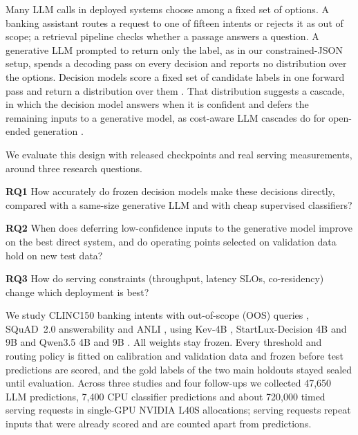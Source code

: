 \documentclass[11pt]{article}
\begin{document}
Many LLM calls in deployed systems choose among a fixed set of options. A banking assistant routes a request to one of fifteen intents or rejects it as out of scope; a retrieval pipeline checks whether a passage answers a question. A generative LLM prompted to return only the label, as in our constrained-JSON setup, spends a decoding pass on every decision and reports no distribution over the options. Decision models score a fixed set of candidate labels in one forward pass and return a distribution over them \citep{li2026jevcascade,zhuang2026startlux}. That distribution suggests a cascade, in which the decision model answers when it is confident and defers the remaining inputs to a generative model, as cost-aware LLM cascades do for open-ended generation \citep{chen2023frugalgpt,gupta2024cascades}.

We evaluate this design with released checkpoints and real serving measurements, around three research questions.

\textbf{RQ1} How accurately do frozen decision models make these decisions directly, compared with a same-size generative LLM and with cheap supervised classifiers?

\textbf{RQ2} When does deferring low-confidence inputs to the generative model improve on the best direct system, and do operating points selected on validation data hold on new test data?

\textbf{RQ3} How do serving constraints (throughput, latency SLOs, co-residency) change which deployment is best?

We study CLINC150 banking intents with out-of-scope (OOS) queries \citep{larson-etal-2019-evaluation}, SQuAD~2.0 answerability \citep{rajpurkar-etal-2018-know} and ANLI \citep{nie-etal-2020-adversarial}, using Kev-4B \citep{kev4b}, StartLux-Decision 4B and 9B \citep{zhuang2026startlux} and Qwen3.5 4B and 9B \citep{qwen35}. All weights stay frozen. Every threshold and routing policy is fitted on calibration and validation data and frozen before test predictions are scored, and the gold labels of the two main holdouts stayed sealed until evaluation. Across three studies and four follow-ups we collected 47,650 LLM predictions, 7,400 CPU classifier predictions and about 720,000 timed serving requests in single-GPU NVIDIA L40S allocations; serving requests repeat inputs that were already scored and are counted apart from predictions.
\end{document}
